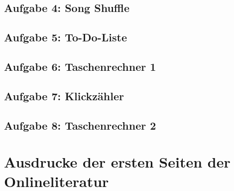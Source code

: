 \begin{appendices}



\subsection{Aufgabe 4: Song Shuffle}
\label{app:code4}






\subsection{Aufgabe 5: To-Do-Liste}
\label{app:code5}






\subsection{Aufgabe 6: Taschenrechner 1}
\label{app:code6}




\subsection{Aufgabe 7: Klickzähler}
\label{app:code7}




\subsection{Aufgabe 8: Taschenrechner 2}
\label{app:code8}




\section{Ausdrucke der ersten Seiten der Onlineliteratur}
\pagebreak


\end{appendices}